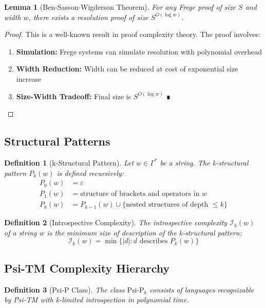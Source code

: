 \documentclass[11pt]{article}
\newtheorem{definition}{Definition}
\newtheorem{lemma}{Lemma}
\begin{document}
\begin{lemma}[Ben-Sasson-Wigderson Theorem]
For any Frege proof of size $S$ and width $w$, there exists a resolution proof of size $S^{O(\log w)}$.
\end{lemma}

\begin{proof}
This is a well-known result in proof complexity theory. The proof involves:
\begin{enumerate}
\item \textbf{Simulation:} Frege systems can simulate resolution with polynomial overhead
\item \textbf{Width Reduction:} Width can be reduced at cost of exponential size increase
\item \textbf{Size-Width Tradeoff:} Final size is $S^{O(\log w)}$ ∎
\end{enumerate}
\end{proof}

\subsection{Structural Patterns}

\begin{definition}[k-Structural Pattern]
Let $w \in \Gamma^*$ be a string. The k-structural pattern $P_k(w)$ is defined recursively:
\begin{align*}
P_0(w) &= \varepsilon \\
P_1(w) &= \text{structure of brackets and operators in } w \\
P_k(w) &= P_{k-1}(w) \cup \{\text{nested structures of depth } \leq k\}
\end{align*}
\end{definition}

\begin{definition}[Introspective Complexity]
The introspective complexity $\mathcal{I}_k(w)$ of a string $w$ is the minimum size of description of the k-structural pattern:
$$\mathcal{I}_k(w) = \min\{|d| : d \text{ describes } P_k(w)\}$$
\end{definition}

\subsection{Psi-TM Complexity Hierarchy}

\begin{definition}[Psi-P Class]
The class $\text{Psi-P}_k$ consists of languages recognizable by Psi-TM with k-limited introspection in polynomial time.
\end{definition}
\end{document}

